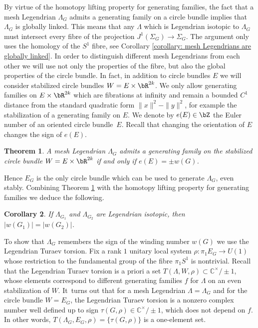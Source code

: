 \documentclass[JEP,XML,SOM,Unicode,NoFloatCountersInSection]{cedram}
\theoremstyle{plain}
\newtheorem{theorem}{Theorem}[section]
\newtheorem{corollary}[theorem]{Corollary}
\theoremstyle{definition}
\newcommand{\bC}{\mathbb{C}}\newcommand{\bD}{\mathbb{D}}
\begin{document}
By virtue of the homotopy lifting property for generating families, the fact that a mesh Legendrian $\Lambda_G$ admits a generating family on a circle bundle implies that $\Lambda_G$ is globally linked. This means that any $\Lambda$ which is Legendrian isotopic to $\Lambda_G$ must intersect every fibre of the projection $J^1(\Sigma_G) \to \Sigma_G$. The argument only uses the homology of the $S^1$ fibre, see Corollary \ref{corollary: mesh Legendrians are globally linked}. In order to distinguish different mesh Legendrians from each other we will use not only the properties of the fibre, but also the global properties of the circle bundle. In fact, in addition to circle bundles $E$ we will consider stabilized circle bundles $W=E \times \bR^{2k}$. We only allow generating families on $E \times \bR^{2k}$ which are fibrations at infinity and remain a bounded $C^1$ distance from the standard quadratic form $\|x\|^2-\|y\|^2$, for example the stabilization of a generating family on $E$. We denote by $e(E) \in \bZ$ the Euler number of an oriented circle bundle~$E$. Recall that changing the orientation of $E$ changes the sign of $e(E)$.

\begin{theorem}\label{euler} A mesh Legendrian $\Lambda_G$ admits a generating family on the stabilized circle bundle $W=E \times \bR^{2k}$ if and only if $e(E)=\pm w(G)$.
\end{theorem}

Hence $E_G$ is the only circle bundle which can be used to generate $\Lambda_G$, even stably. Combining Theorem \ref{euler} with the homotopy lifting property for generating families we deduce the following.

\begin{corollary}\label{reidemeister}
If $\Lambda_{G_1}$ and $\Lambda_{G_2}$ are Legendrian isotopic, then $|w(G_1)|=|w(G_2)|$.
\end{corollary}

To show that $\Lambda_G$ remembers the sign of the winding number $w(G)$ we use the Legendrian Turaev torsion. Fix a rank $1$ unitary local system $\rho: \pi_1 E_G \to U(1)$ whose restriction to the fundamental group of the fibre $\pi_1S^1$ is nontrivial. Recall that the Legendrian Turaev torsion is a priori a set $T(\Lambda, W, \rho) \subset \bC^\times / \pm 1$, whose elements correspond to different generating families $f$ for $\Lambda$ on an even stabilization of $W$. It~turns out that for a mesh Legendrian $\Lambda=\Lambda_G$ and for the circle bundle $W=E_G$, the Legendrian Turaev torsion is a nonzero complex number well defined up to sign $\tau(G, \rho) \in \bC^\times/ \pm 1$, which does not depend on $f$. In other words, $T(\Lambda_G,E_G,\rho)=\{\tau(G,\rho)\}$ is a one-element set.
\end{document}
